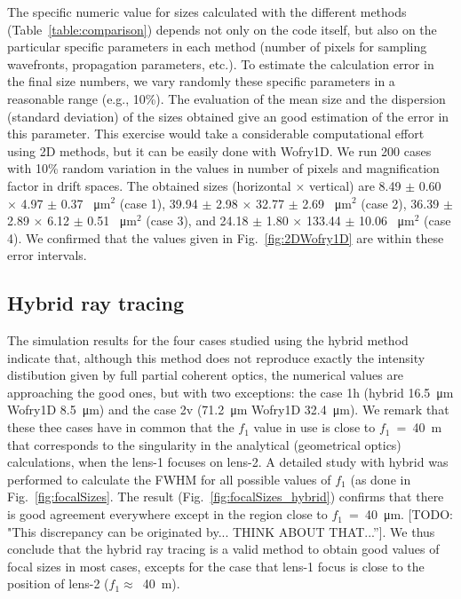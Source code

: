 \documentclass{iucr}              %
\newcommand{\todo}[1]{{\color{red}[TODO: "#1'']}}
\begin{document}
The specific numeric value for sizes calculated with the different methods (Table~\ref{table:comparison}) depends not only on the code itself, but also on the particular specific parameters in each method (number of pixels for sampling wavefronts, propagation parameters, etc.). To estimate the calculation error in the final size numbers, we vary randomly these specific parameters in a reasonable range (e.g., 10\%). The evaluation of the mean size and the dispersion (standard deviation) of the sizes obtained give an good estimation of the error in this parameter. This exercise would take a considerable computational effort using 2D methods, but it can be easily done with Wofry1D. We run 200 cases with 10\% random variation in the values in number of pixels and magnification factor in drift spaces. The obtained sizes (horizontal $\times$ vertical) are  
8.49 $\pm$ 0.60 $\times$ 4.97 $\pm$ 0.37 \SI{}{\micro\meter}$^2$ (case 1),
39.94 $\pm$ 2.98 $\times$ 32.77 $\pm$ 2.69 \SI{}{\micro\meter}$^2$ (case 2),
36.39 $\pm$ 2.89 $\times$ 6.12 $\pm$ 0.51 \SI{}{\micro\meter}$^2$ (case 3), and
24.18 $\pm$ 1.80 $\times$ 133.44 $\pm$ 10.06 \SI{}{\micro\meter}$^2$ (case 4). We confirmed that the values given in Fig.~\ref{fig:2DWofry1D} are within these error intervals.

\subsection{Hybrid ray tracing}

The simulation results for the four cases studied using the hybrid method indicate that, although this method does not reproduce exactly the intensity distibution given by full partial coherent optics, the numerical values are approaching the good ones, but with two exceptions: the case 
1h (hybrid \SI{16.5}{\micro\meter} Wofry1D \SI{8.5}{\micro\meter}) and the case 
2v (\SI{71.2}{\micro\meter} Wofry1D \SI{32.4}{\micro\meter}). 
We remark that these thee cases have in common that the $f_1$ value in use is close to $f_1$~=~\SI{40}{\meter} that corresponds to the singularity in the analytical (geometrical optics) calculations, when the lens-1 focuses on lens-2. A detailed study with hybrid was performed to calculate the FWHM for all possible values of $f_1$ (as done in Fig.~\ref{fig:focalSizes}. The result (Fig.~\ref{fig:focalSizes_hybrid}) confirms that there is good agreement everywhere except in the region close to $f_1$~=~\SI{40}{\micro\meter}.  \todo{This discrepancy can be originated by... THINK ABOUT THAT...}. We thus conclude that the hybrid ray tracing is a valid method to obtain good values of focal sizes in most cases, excepts for the case that lens-1 focus is close to the position of lens-2 ($f_1 \approx $~\SI{40}{\meter}).
\end{document}
